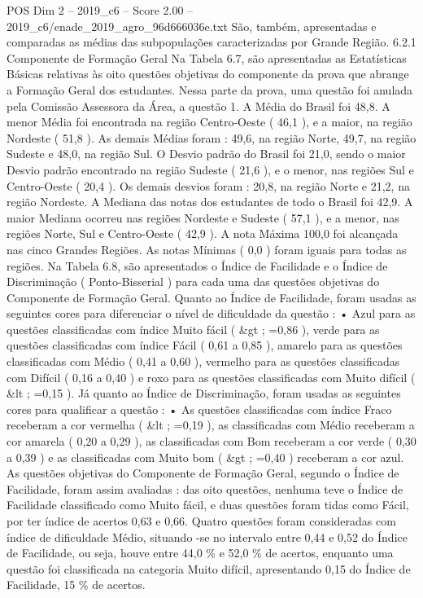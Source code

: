 \begin{textsample}{POS Dim 2 – 2019\_c6 – Score 2.00 – 2019\_c6/enade\_2019\_agro\_96d666036e.txt}
São, também, apresentadas e comparadas as médias das subpopulações caracterizadas por Grande Região. 6.2.1 Componente de Formação Geral Na Tabela 6.7, são apresentadas as Estatísticas Básicas relativas às oito questões objetivas do componente da prova que abrange a Formação Geral dos estudantes.
Nessa parte da prova, uma questão foi anulada pela Comissão Assessora da Área, a questão 1.
A Média do Brasil foi 48,8.
A menor Média foi encontrada na região Centro-Oeste ( 46,1 ), e a maior, na região Nordeste ( 51,8 ).
As demais Médias foram : 49,6, na região Norte, 49,7, na região Sudeste e 48,0, na região Sul.
O Desvio padrão do Brasil foi 21,0, sendo o maior Desvio padrão encontrado na região Sudeste ( 21,6 ), e o menor, nas regiões Sul e Centro-Oeste ( 20,4 ).
Os demais desvios foram : 20,8, na região Norte e 21,2, na região Nordeste.
A Mediana das notas dos estudantes de todo o Brasil foi 42,9.
A maior Mediana ocorreu nas regiões Nordeste e Sudeste ( 57,1 ), e a menor, nas regiões Norte, Sul e Centro-Oeste ( 42,9 ).
A nota Máxima 100,0 foi alcançada nas cinco Grandes Regiões.
As notas Mínimas ( 0,0 ) foram iguais para todas as regiões.
Na Tabela 6.8, são apresentados o Índice de Facilidade e o Índice de Discriminação ( Ponto-Bisserial ) para cada uma das questões objetivas do Componente de Formação Geral.
Quanto ao Índice de Facilidade, foram usadas as seguintes cores para diferenciar o nível de dificuldade da questão : • Azul para as questões classificadas com índice Muito fácil ( \&gt ; =0,86 ), verde para as questões classificadas com índice Fácil ( 0,61 a 0,85 ), amarelo para as questões classificadas com Médio ( 0,41 a 0,60 ), vermelho para as questões classificadas com Difícil ( 0,16 a 0,40 ) e roxo para as questões classificadas com Muito difícil ( \&lt ; =0,15 ).
Já quanto ao Índice de Discriminação, foram usadas as seguintes cores para qualificar a questão : • As questões classificadas com índice Fraco receberam a cor vermelha ( \&lt ; =0,19 ), as classificadas com Médio receberam a cor amarela ( 0,20 a 0,29 ), as classificadas com Bom receberam a cor verde ( 0,30 a 0,39 ) e as classificadas com Muito bom ( \&gt ; =0,40 ) receberam a cor azul.
As questões objetivas do Componente de Formação Geral, segundo o Índice de Facilidade, foram assim avaliadas : das oito questões, nenhuma teve o Índice de Facilidade classificado como Muito fácil, e duas questões foram tidas como Fácil, por ter índice de acertos 0,63 e 0,66.
Quatro questões foram consideradas com índice de dificuldade Médio, situando -se no intervalo entre 0,44 e 0,52 do Índice de Facilidade, ou seja, houve entre 44,0 \% e 52,0 \% de acertos, enquanto uma questão foi classificada na categoria Muito difícil, apresentando 0,15 do Índice de Facilidade, 15 \% de acertos.

\end{textsample}
